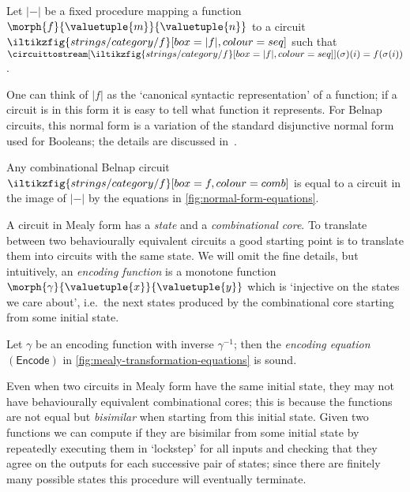 \documentclass[10pt]{article}
\begin{document}
\begin{definition}
    Let \(\lvert{-}\rvert\) be a fixed procedure mapping a function
    \(\morph{f}{\valuetuple{m}}{\valuetuple{n}}\) to a circuit \(
    \iltikzfig{strings/category/f}[box=|f|,colour=seq]
    \) such that \(
    \circuittostream[
        \iltikzfig{strings/category/f}[box=|f|,colour=seq]
    ]{}(\sigma)(i)
    =
    f(\sigma(i))
    \).
\end{definition}

One can think of \(|f|\) as the `canonical syntactic representation' of a
function; if a circuit is in this form it is easy to tell what function it
represents.
For Belnap circuits, this normal form is a variation of the standard disjunctive
normal form used for Booleans; the details are discussed
in~\cite[App. A]{ghica2024fully}.

\begin{lemma}
    Any combinational Belnap circuit \(
    \iltikzfig{strings/category/f}[box=f,colour=comb]
    \) is equal to a circuit in the image of \(\lvert{-}\rvert\) by the
    equations in \cref{fig:normal-form-equations}.
\end{lemma}

A circuit in Mealy form has a \emph{state} and a \emph{combinational core}.
To translate between two behaviourally equivalent circuits a good starting point
is to translate them into circuits with the same state.
We will omit the fine details, but intuitively, an
\emph{encoding function} is a monotone function
\(\morph{\gamma}{\valuetuple{x}}{\valuetuple{y}}\) which is `injective on the
states we care about', i.e.\ the next states produced by the combinational core
starting from some initial state.

\begin{lemma}
    Let \(\gamma\) be an encoding function with inverse \(\gamma^{-1}\); then
    the \emph{encoding equation} \((\mathsf{Encode})\) in
    \cref{fig:mealy-transformation-equations} is sound.
\end{lemma}

Even when two circuits in Mealy form have the same initial state, they may not
have behaviourally equivalent combinational cores; this is because the functions
are not equal but \emph{bisimilar} when starting from this initial state.
Given two functions we can compute if they are bisimilar from some initial state
by repeatedly executing them in `lockstep' for all inputs and checking that they
agree on the outputs for each successive pair of states; since there are
finitely many possible states this procedure will eventually terminate.
\end{document}
